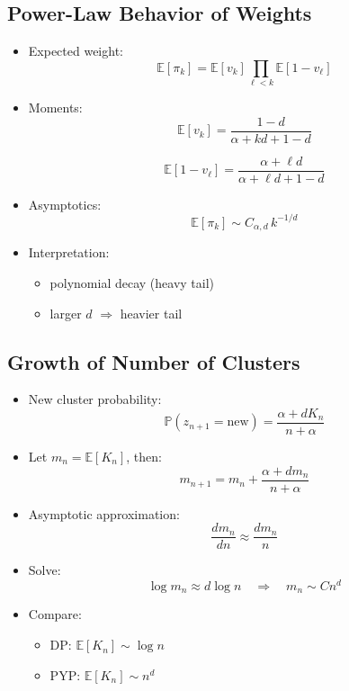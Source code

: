 \documentclass[12pt,oneside]{book}
\numberwithin{equation}{section}
\theoremstyle{definition}
\theoremstyle{plain}
\theoremstyle{remark}
\begin{document}
\subsection*{Power-Law Behavior of Weights}

\begin{itemize}
\item Expected weight:
\[
\mathbb{E}[\pi_k] = \mathbb{E}[v_k] \prod_{\ell<k} \mathbb{E}[1 - v_\ell]
\]

\item Moments:
\[
\mathbb{E}[v_k] = \frac{1 - d}{\alpha + kd + 1 - d}
\]

\[
\mathbb{E}[1 - v_\ell] = \frac{\alpha + \ell d}{\alpha + \ell d + 1 - d}
\]

\item Asymptotics:
\[
\mathbb{E}[\pi_k] \sim C_{\alpha,d} \, k^{-1/d}
\]

\item Interpretation:
\begin{itemize}
\item polynomial decay (heavy tail)
\item larger $d$ $\Rightarrow$ heavier tail
\end{itemize}
\end{itemize}

\subsection*{Growth of Number of Clusters}

\begin{itemize}
\item New cluster probability:
\[
\mathbb{P}(z_{n+1} = \text{new}) = \frac{\alpha + d K_n}{n + \alpha}
\]

\item Let $m_n = \mathbb{E}[K_n]$, then:
\[
m_{n+1} = m_n + \frac{\alpha + d m_n}{n + \alpha}
\]

\item Asymptotic approximation:
\[
\frac{dm_n}{dn} \approx \frac{d m_n}{n}
\]

\item Solve:
\[
\log m_n \approx d \log n
\quad \Rightarrow \quad
m_n \sim C n^d
\]

\item Compare:
\begin{itemize}
\item DP: $\mathbb{E}[K_n] \sim \log n$
\item PYP: $\mathbb{E}[K_n] \sim n^d$
\end{itemize}
\end{itemize}
\end{document}
